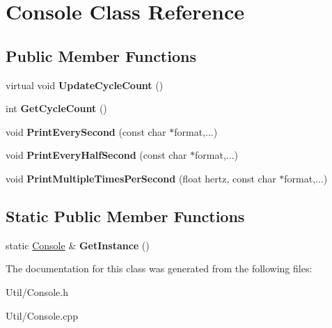 \hypertarget{class_console}{\section{\-Console \-Class \-Reference}
\label{class_console}
}
\subsection*{\-Public \-Member \-Functions}
\begin{DoxyCompactItemize}
\item 
\hypertarget{class_console_a25b10a54442e1372deee3c2b54fbfadd}{virtual void {\bfseries \-Update\-Cycle\-Count} ()}\label{class_console_a25b10a54442e1372deee3c2b54fbfadd}

\item 
\hypertarget{class_console_a7f2f28853a12ad15fecc6efc0580a583}{int {\bfseries \-Get\-Cycle\-Count} ()}\label{class_console_a7f2f28853a12ad15fecc6efc0580a583}

\item 
\hypertarget{class_console_a6ff6891ea662984db70084187965280a}{void {\bfseries \-Print\-Every\-Second} (const char $\ast$format,...)}\label{class_console_a6ff6891ea662984db70084187965280a}

\item 
\hypertarget{class_console_a4e9c628cb3178632ab04a5588d8467fe}{void {\bfseries \-Print\-Every\-Half\-Second} (const char $\ast$format,...)}\label{class_console_a4e9c628cb3178632ab04a5588d8467fe}

\item 
\hypertarget{class_console_a48d9e27150ad93dd8239eef9da0c5254}{void {\bfseries \-Print\-Multiple\-Times\-Per\-Second} (float hertz, const char $\ast$format,...)}\label{class_console_a48d9e27150ad93dd8239eef9da0c5254}

\end{DoxyCompactItemize}
\subsection*{\-Static \-Public \-Member \-Functions}
\begin{DoxyCompactItemize}
\item 
\hypertarget{class_console_a61d2bbd3b427702716e27a579f97d85a}{static \hyperlink{class_console}{\-Console} \& {\bfseries \-Get\-Instance} ()}\label{class_console_a61d2bbd3b427702716e27a579f97d85a}

\end{DoxyCompactItemize}


\-The documentation for this class was generated from the following files\-:\begin{DoxyCompactItemize}
\item 
\-Util/\-Console.\-h\item 
\-Util/\-Console.\-cpp\end{DoxyCompactItemize}
